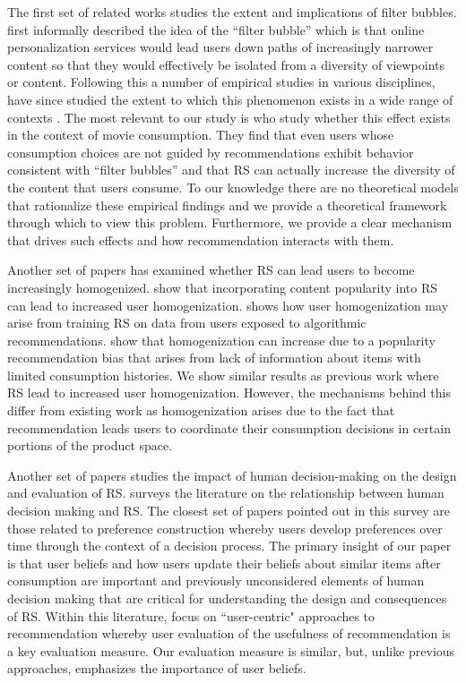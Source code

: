 \documentclass{article}
\newcommand{\xhdr}[1]{\vspace{1mm} \noindent{\bf #1}}
\begin{document}
\par
\xhdr{Related Work.} 
The first set of related works studies the extent and implications of filter bubbles. \cite{pariser2011filter} first informally described the idea of the ``filter bubble'' which is that online personalization services would lead users down paths of increasingly narrower content so that they would effectively be isolated from a diversity of viewpoints or content. Following this\dgedit{,} a number of empirical studies in various disciplines, have since studied the extent to which this phenomenon exists in a wide range of contexts \cite{flaxman2016filter,hosanagar2013will,moller2018blame,nguyen2014exploring}. The most relevant to our study is \cite{nguyen2014exploring} who study whether this effect exists in the context of movie consumption. They find that even users whose consumption choices are not guided by recommendations exhibit behavior consistent with ``filter bubbles'' and that RS can actually increase the diversity of the content that users consume. To our knowledge there are no theoretical models that rationalize these empirical findings and we provide a theoretical framework through which to view this problem. Furthermore, we provide a clear mechanism that drives such effects and how recommendation interacts with them.
\par 
Another set of papers has examined whether RS can lead users to become increasingly homogenized. \cite{celma2008hits, treviranus2009value} show that incorporating content popularity into RS can lead to increased user homogenization. \cite{chaney2018algorithmic} shows how user homogenization may arise from training RS on data from users exposed to algorithmic recommendations. \cite{fleder2009blockbuster} show that homogenization can increase due to a popularity recommendation bias that arises from lack of information about items with limited consumption histories. We show similar results as previous work where RS lead to increased user homogenization. However, the mechanisms behind this differ from existing work as homogenization arises due to the fact that recommendation leads users to coordinate their consumption decisions in certain portions of the product space.
\par
Another set of papers studies the impact of human decision-making on the design and evaluation of RS. \cite{chen2013human} surveys the literature on the relationship between human decision making and RS. The closest set of papers pointed out in this survey are those related to preference construction \cite{bettman1998constructive, lichtenstein2006construction} whereby users develop preferences over time through the context of a decision process. The primary insight of our paper is that user beliefs and how users update their beliefs about similar items after consumption are important and previously unconsidered elements of human decision making that are critical for understanding the design and consequences of RS. Within this literature, \cite{celma2008new, cremonesi2013user, pu2011user} focus on ``user-centric" approaches to recommendation whereby user evaluation of the usefulness of recommendation is a key evaluation measure. Our evaluation measure is similar, but, unlike previous approaches, emphasizes the importance of user beliefs.
\end{document}

